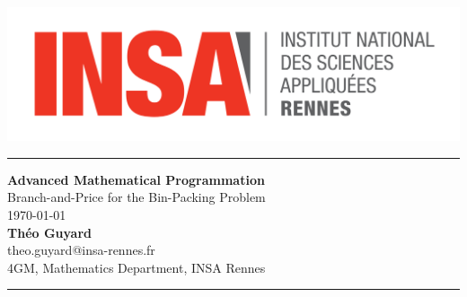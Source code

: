 \begin{titlepage}
	\includegraphics[scale=0.1]{img/logo-insa.png}
	\vfill
	\noindent\rule{\textwidth}{1pt}
	\begin{center}
		{\Huge \textbf{Advanced Mathematical Programmation}}
		\vspace{0.1cm} \\
		{\Large Branch-and-Price for the Bin-Packing Problem}
		\vspace{0.5cm} \\
		\today
		\vspace{0.5cm} \\
		\textbf{Théo Guyard}
		\vspace{0.1cm} \\
		theo.guyard@insa-rennes.fr
		\vspace{0.1cm} \\
		4GM, Mathematics Department, INSA Rennes
		\vspace{0.5cm} \\
	\end{center}
	\noindent\rule{\textwidth}{1pt}
	\vspace{3cm}
	\vfill
	
\end{titlepage}